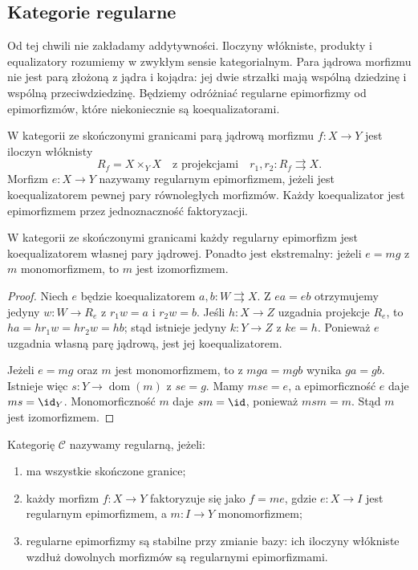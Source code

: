 \subsection{Kategorie regularne}

Od tej chwili nie zakładamy addytywności. Iloczyny włókniste, produkty i equalizatory rozumiemy w zwykłym sensie kategorialnym. Para jądrowa morfizmu nie jest parą złożoną z jądra i kojądra: jej dwie strzałki mają wspólną dziedzinę i wspólną przeciwdziedzinę. Będziemy odróżniać regularne epimorfizmy od epimorfizmów, które niekoniecznie są koequalizatorami.

\begin{definicja}\label{cat:def:barr-kernel-pair}
W kategorii ze skończonymi granicami parą jądrową morfizmu $f:X\to Y$ jest iloczyn włóknisty
\[
 R_f=X\times_Y X
 \quad\text{z projekcjami}\quad r_1,r_2:R_f\rightrightarrows X.
\]
Morfizm $e:X\to Y$ nazywamy regularnym epimorfizmem, jeżeli jest koequalizatorem pewnej pary równoległych morfizmów. Każdy koequalizator jest epimorfizmem przez jednoznaczność faktoryzacji.
\end{definicja}

\begin{lemat}\label{cat:lem:barr-regular-epi}
W kategorii ze skończonymi granicami każdy regularny epimorfizm jest koequalizatorem własnej pary jądrowej. Ponadto jest ekstremalny: jeżeli $e=mg$ z $m$ monomorfizmem, to $m$ jest izomorfizmem.
\end{lemat}
\begin{proof}
Niech $e$ będzie koequalizatorem $a,b:W\rightrightarrows X$. Z $ea=eb$ otrzymujemy jedyny $w:W\to R_e$ z $r_1w=a$ i $r_2w=b$. Jeśli $h:X\to Z$ uzgadnia projekcje $R_e$, to $ha=hr_1w=hr_2w=hb$; stąd istnieje jedyny $k:Y\to Z$ z $ke=h$. Ponieważ $e$ uzgadnia własną parę jądrową, jest jej koequalizatorem.

Jeżeli $e=mg$ oraz $m$ jest monomorfizmem, to z $mga=mgb$ wynika $ga=gb$. Istnieje więc $s:Y\to\operatorname{dom}(m)$ z $se=g$. Mamy $mse=e$, a epimorficzność $e$ daje $ms=\id_Y$. Monomorficzność $m$ daje $sm=\id$, ponieważ $msm=m$. Stąd $m$ jest izomorfizmem.
\end{proof}

\begin{definicja}\label{cat:def:barr-regular}
Kategorię $\mathcal C$ nazywamy regularną, jeżeli:
\begin{enumerate}
 \item ma wszystkie skończone granice;
 \item każdy morfizm $f:X\to Y$ faktoryzuje się jako $f=me$, gdzie $e:X\to I$ jest regularnym epimorfizmem, a $m:I\to Y$ monomorfizmem;
 \item regularne epimorfizmy są stabilne przy zmianie bazy: ich iloczyny włókniste wzdłuż dowolnych morfizmów są regularnymi epimorfizmami.
\end{enumerate}
\end{definicja}

